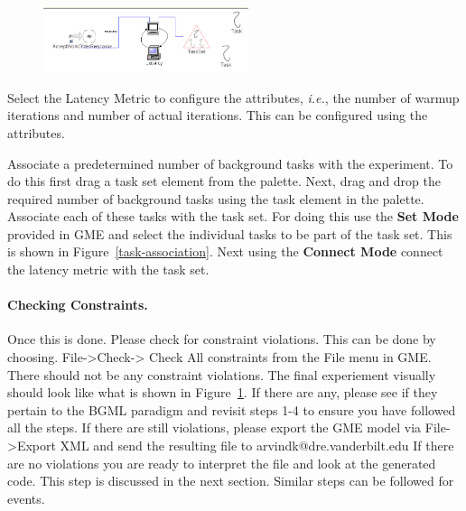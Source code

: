 \documentclass[onecolumn]{article}
\begin{document}
\begin{figure}[ht]
{
 \includegraphics[width=6cm]{BGML-Latency-Complete.png}
 \label{task-complete}
}
\end{figure}

\smallskip
{} Select the Latency Metric to configure the
attributes, {\em i.e.}, the number of warmup iterations and number of
actual iterations. This can be configured using the attributes.

\smallskip
{} Associate a predetermined number of background tasks
with the experiment. To do this first drag a task set element from the
palette. Next, drag and drop the required number of background tasks
using the task element in the palette. Associate each of these tasks
with the task set. For doing this use the {\bf Set Mode} provided in
GME and select the individual tasks to be part of the task set. This
is shown in Figure~\ref{task-association}. Next using the {\bf Connect Mode}
connect the latency metric with the task set.

\paragraph* {\bf Checking Constraints.}
Once this is done. Please check for constraint violations. This can be done by
choosing. File->Check-> Check All constraints from the File menu in GME. There
should not be any constraint violations. The final experiement visually should
look like what is shown in Figure~\ref{task-complete}. If there are any, please see if they
pertain to the BGML paradigm and revisit steps 1-4 to ensure you have followed
all the steps. If there are still violations, please export the GME model via
File->Export XML and send the resulting file to arvindk@dre.vanderbilt.edu If
there are no violations you are ready to interpret the file and look at the
generated code. This step is discussed in the next section. Similar steps can
be followed for events.
\end{document}
